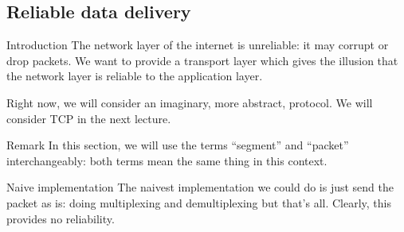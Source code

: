 \documentclass[a4paper]{article}
\begin{document}
\subsection{Reliable data delivery}
\begin{parag}{Introduction}
    The network layer of the internet is unreliable: it may corrupt or drop packets. We want to provide a transport layer which gives the illusion that the network layer is reliable to the application layer.

    Right now, we will consider an imaginary, more abstract, protocol. We will consider TCP in the next lecture.

    \begin{subparag}{Remark}
        In this section, we will use the terms ``segment'' and ``packet'' interchangeably: both terms mean the same thing in this context.
    \end{subparag}
\end{parag}

\begin{parag}{Naive implementation}
    The naivest implementation we could do is just send the packet as is: doing multiplexing and demultiplexing but that's all. Clearly, this provides no reliability. 
\end{parag}
\end{document}
